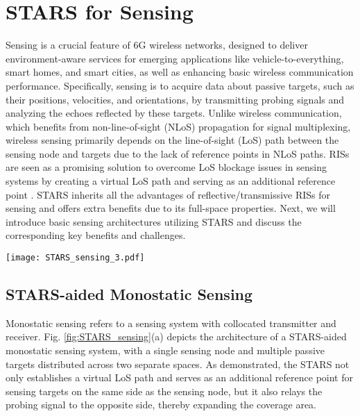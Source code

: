 \documentclass[journal]{IEEEtran}
\theoremstyle{definition}
\begin{document}
\section{STARS for Sensing}
Sensing is a crucial feature of 6G wireless networks, designed to deliver environment-aware services for emerging applications like vehicle-to-everything, smart homes, and smart cities, as well as enhancing basic wireless communication performance. Specifically, sensing is to acquire data about passive targets, such as their positions, velocities, and orientations, by transmitting probing signals and analyzing the echoes reflected by these targets. Unlike wireless communication, which benefits from non-line-of-sight (NLoS) propagation for signal multiplexing, wireless sensing primarily depends on the line-of-sight (LoS) path between the sensing node and targets due to the lack of reference points in NLoS paths. RISs are seen as a promising solution to overcome LoS blockage issues in sensing systems by creating a virtual LoS path and serving as an additional reference point \cite{wymeersch2020radio}. STARS inherits all the advantages of reflective/transmissive RISs for sensing and offers extra benefits due to its full-space properties. Next, we will introduce basic sensing architectures utilizing STARS and discuss the corresponding key benefits and challenges. 


\begin{figure*}[t!]
\begin{center}
    \texttt{[image: STARS\_sensing\_3.pdf]}
    \caption{Conceptual illustration of three proposed sensing architecture utilizing STARS: (a) (a) STARS-aided monostatic sensing, where the transmission sensing node also serves as the reception node; (b) STARS-enabled bistatic sensing, where STARS functions as the reception node with the aid of active sensors; and (c) Sensing with target-mounted STARS, where STARS controls signal reflection at the target and enhances the communication service inside the target.}
    \label{fig:STARS_sensing}
\end{center}
\end{figure*}

\subsection{STARS-aided Monostatic Sensing}

Monostatic sensing refers to a sensing system with collocated transmitter and receiver. 
Fig. \ref{fig:STARS_sensing}(a) depicts the architecture of a STARS-aided monostatic sensing system, with a single sensing node and multiple passive targets distributed across two separate spaces. As demonstrated, the STARS not only establishes a virtual LoS path and serves as an additional reference point for sensing targets on the same side as the sensing node, but it also relays the probing signal to the opposite side, thereby expanding the coverage area. 
\end{document}
